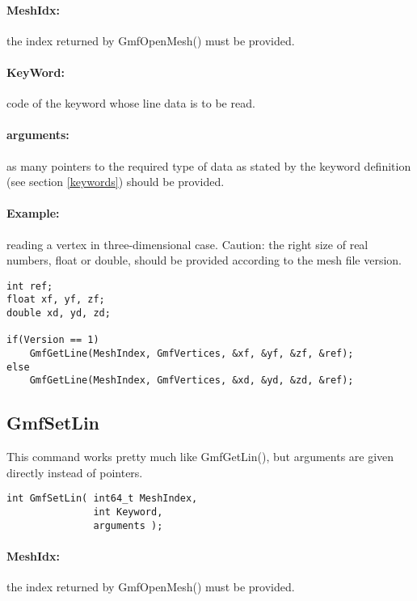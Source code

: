 \documentclass[a4paper,12pt]{article}
\begin{document}
\paragraph{MeshIdx:}
the index returned by GmfOpenMesh() must be provided.

\paragraph{KeyWord:} code of the keyword whose line data is to be read.

\paragraph{arguments:} as many pointers to the required type of data as stated by the keyword definition (see section \ref{keywords}) should be provided.

\paragraph{Example:} reading a vertex in three-dimensional case. Caution: the right size of real numbers, float or double, should be provided according to the mesh file version.

\begin{tt}
\begin{verbatim}
int ref;
float xf, yf, zf;
double xd, yd, zd;

if(Version == 1)
    GmfGetLine(MeshIndex, GmfVertices, &xf, &yf, &zf, &ref);
else
    GmfGetLine(MeshIndex, GmfVertices, &xd, &yd, &zd, &ref);
\end{verbatim}
\end{tt}
\normalfont


\subsection{GmfSetLin}
This command works pretty much like GmfGetLin(), but arguments are given directly instead of pointers.

\begin{tt}
\begin{verbatim}
int GmfSetLin( int64_t MeshIndex,
               int Keyword,
               arguments );
\end{verbatim}
\end{tt}
\normalfont

\paragraph{MeshIdx:}
the index returned by GmfOpenMesh() must be provided.
\end{document}
